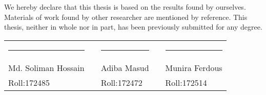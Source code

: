 We hereby declare that this thesis is based on the results found by ourselves.
Materials of work found by other researcher are mentioned by reference. This thesis,
neither in whole nor in part, has been previously submitted for any degree.

\vspace{1in}


\noindent \begin{tabular}{p{4cm}p{.5cm}p{4cm}p{.5cm}p{4cm}}
\centering        
  \rule{4cm}{1pt} && \rule{4cm}{1pt} && \rule{4cm}{1pt}\\
  Md. Soliman Hossain
  &&Adiba Masud
  &&Munira Ferdous \\
  Roll:172485 &&Roll:172472 &&Roll:172514 
\end{tabular}


